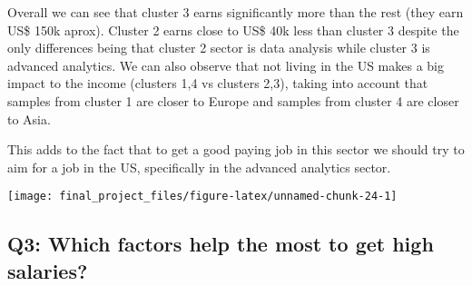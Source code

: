 \documentclass[
]{article}
\begin{document}
\scriptsize

\begin{table}[!h]
\centering
{}
\end{table}

\normalsize

Overall we can see that cluster 3 earns significantly more than the rest
(they earn US\$ 150k aprox). Cluster 2 earns close to US\$ 40k less than
cluster 3 despite the only differences being that cluster 2 sector is
data analysis while cluster 3 is advanced analytics. We can also observe
that not living in the US makes a big impact to the income (clusters 1,4
vs clusters 2,3), taking into account that samples from cluster 1 are
closer to Europe and samples from cluster 4 are closer to Asia.

This adds to the fact that to get a good paying job in this sector we
should try to aim for a job in the US, specifically in the advanced
analytics sector.

\scriptsize

\begin{center}\texttt{[image: final\_project\_files/figure-latex/unnamed-chunk-24-1]} \end{center}

\normalsize

\hypertarget{q3-which-factors-help-the-most-to-get-high-salaries}{%
\subsection{Q3: Which factors help the most to get high
salaries?}\label{q3-which-factors-help-the-most-to-get-high-salaries}}
\end{document}
